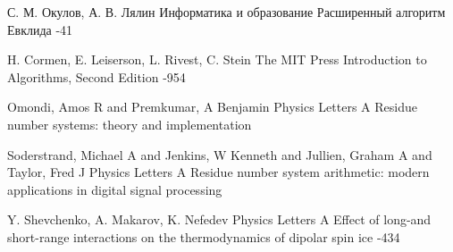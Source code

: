 \documentclass[10pt]{article}
\begin{document}
\begin{thebibliography}{20}
\setlength{\parsep}{0pt}\setlength{\itemsep}{3pt}

	\by С. М. Окулов, А. В. Лялин
	\jour Информатика и образование
	\paper Расширенный алгоритм Евклида
	-41

\by H. Cormen, E. Leiserson, L. Rivest, C. Stein
\jour The MIT Press 
\paper Introduction to Algorithms, Second Edition
-954


\by Omondi, Amos R and Premkumar, A Benjamin
\jour Physics Letters A
\paper Residue number systems: theory and implementation


\by Soderstrand, Michael A and Jenkins, W Kenneth and Jullien, Graham A and Taylor, Fred J
\jour Physics Letters A
\paper Residue number system arithmetic: modern applications in digital signal processing

\by Y. Shevchenko, A. Makarov, K. Nefedev
\jour Physics Letters A
\paper Effect of long-and short-range interactions on the thermodynamics of dipolar spin ice
-434

\end{thebibliography}



\EndArticle
\end{document}
